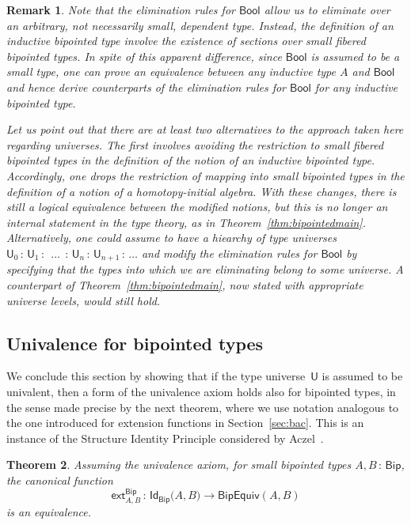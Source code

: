 \documentclass[10pt,a4paper,oneside,reqno]{amsart}
\numberwithin{equation}{section}
\theoremstyle{mythm}
\newtheorem{theorem}{Theorem}[section]
\theoremstyle{mydef}
\theoremstyle{myrmk}
\newtheorem{remark}[theorem]{Remark}
\newcommand{\ie}{\text{i.e.\ }}
\newcommand{\co}{\,{:}\,}
\newcommand{\ext}{\mathsf{ext}}
\newcommand{\Bool}{\mathsf{Bool}}
\newcommand{\Id}{\mathsf{Id}}
\newcommand{\U}{\mathsf{U}}
\newcommand{\Bip}{\mathsf{Bip}}
\newcommand{\BipEquiv}{\mathsf{BipEquiv}}
\begin{document}
\begin{remark} \label{thm:smallelimination} Note that the elimination rules for $\Bool$ allow us to eliminate 
over an arbitrary, \ie not necessarily small, dependent type. Instead, the definition of an inductive bipointed
type involve the existence of sections over small fibered bipointed types. In spite of this apparent difference,
since $\Bool$ is assumed to be a small type, one can prove an equivalence between any inductive type $A$
and $\Bool$ and hence derive counterparts of the elimination rules for $\Bool$ for any inductive bipointed type. 

Let us point out that there are at least two alternatives to the approach taken here regarding universes. The first involves avoiding the restriction
to \emph{small} fibered bipointed types in the definition of the notion of an inductive bipointed type. Accordingly,
one drops the restriction of mapping into \emph{small} bipointed types in the definition of a notion of a homotopy-initial
algebra. With these changes, there is still a logical equivalence between the modified notions, but this is no longer an internal statement in the type theory, as in Theorem~\ref{thm:bipointedmain}. Alternatively, one could assume to
have a hiearchy of type universes $\U_0 \co \U_1 \co \; \ldots \; \co \U_n \co \U_{n+1} \co \ldots$ and modify the elimination rules for $\Bool$ by specifying that the types into which we are eliminating belong to some universe. 
A counterpart of Theorem~\ref{thm:bipointedmain}, now stated with appropriate universe levels, would still hold.
 \end{remark}


\subsection*{Univalence for bipointed types} \label{sec:unibip}
We conclude this section by showing that if the type universe~$\U$ is assumed to be univalent, then a form of the univalence axiom holds also for bipointed types, in the sense made precise by the next theorem, where we
use notation analogous to the one introduced for extension functions in Section~\ref{sec:bac}. This is an
instance of the Structure Identity Principle considered by Aczel~\cite{AczelP:stripu}.


\begin{theorem}  \label{thm:bipunivalence} Assuming the univalence axiom, 
for small bipointed types $A, B \co \Bip$, the  canonical function
\[ 
\ext^{\Bip}_{A,B} \co \Id_{\Bip} \big(A,B\big) \to  \BipEquiv(A,B) 
\] 
is an equivalence.
\end{theorem} 
\end{document}
